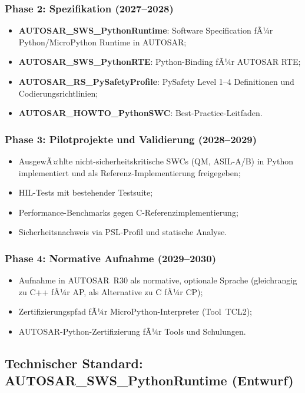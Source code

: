 ﻿\documentclass[12pt,a4paper,twoside]{article}
\begin{document}
\subsubsection{Phase 2: Spezifikation (2027--2028)}
\begin{itemize}
  \item \textbf{AUTOSAR\_SWS\_PythonRuntime}: Software Specification fÃ¼r
        Python/MicroPython Runtime in AUTOSAR;
  \item \textbf{AUTOSAR\_SWS\_PythonRTE}: Python-Binding fÃ¼r AUTOSAR RTE;
  \item \textbf{AUTOSAR\_RS\_PySafetyProfile}: PySafety Level 1--4 Definitionen
        und Codierungsrichtlinien;
  \item \textbf{AUTOSAR\_HOWTO\_PythonSWC}: Best-Practice-Leitfaden.
\end{itemize}

\subsubsection{Phase 3: Pilotprojekte und Validierung (2028--2029)}
\begin{itemize}
  \item AusgewÃ¤hlte nicht-sicherheitskritische SWCs (QM, ASIL-A/B)
        in Python implementiert und als Referenz-Implementierung freigegeben;
  \item HIL-Tests mit bestehender Testsuite;
  \item Performance-Benchmarks gegen C-Referenzimplementierung;
  \item Sicherheitsnachweis via PSL-Profil und statische Analyse.
\end{itemize}

\subsubsection{Phase 4: Normative Aufnahme (2029--2030)}
\begin{itemize}
  \item Aufnahme in AUTOSAR~R30 als normative, optionale Sprache
        (gleichrangig zu C++ fÃ¼r AP, als Alternative zu C fÃ¼r CP);
  \item Zertifizierungspfad fÃ¼r MicroPython-Interpreter (Tool~TCL2);
  \item AUTOSAR-Python-Zertifizierung fÃ¼r Tools und Schulungen.
\end{itemize}

\subsection{Technischer Standard: AUTOSAR\_SWS\_PythonRuntime (Entwurf)}
\label{subsec:sws_draft}
\end{document}
